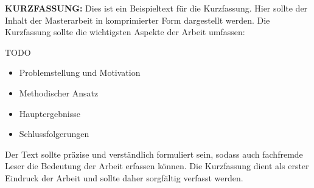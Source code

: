 

\textbf{KURZFASSUNG:} Dies ist ein Beispieltext für die Kurzfassung. Hier sollte der Inhalt der Masterarbeit in komprimierter
Form dargestellt werden. Die Kurzfassung sollte die wichtigsten Aspekte der Arbeit umfassen:

TODO

\begin{itemize}[leftmargin=0.63cm, label=\textbullet]
    \item Problemstellung und Motivation
    \item Methodischer Ansatz
    \item Hauptergebnisse
    \item Schlussfolgerungen
\end{itemize}

Der Text sollte präzise und verständlich formuliert sein, sodass auch fachfremde Leser die Bedeutung der
Arbeit erfassen können. Die Kurzfassung dient als erster Eindruck der Arbeit und sollte daher sorgfältig verfasst werden.


\clearpage
